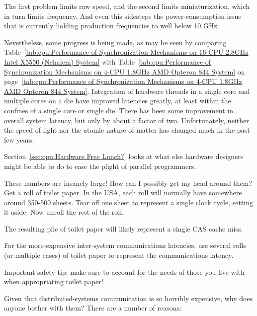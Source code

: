 	The first problem limits raw speed, and the second limits
	miniaturization, which in turn limits frequency.
	And even this sidesteps the power-consumption issue that
	is currently holding production frequencies to well below
	10 GHz.

	Nevertheless, some progress is being made, as may be seen
	by comparing
	Table~\ref{tab:cpu:Performance of Synchronization Mechanisms on 16-CPU 2.8GHz Intel X5550 (Nehalem) System}
	with
	Table~\ref{tab:cpu:Performance of Synchronization Mechanisms on 4-CPU 1.8GHz AMD Opteron 844 System}
	on
	page~\ref{tab:cpu:Performance of Synchronization Mechanisms on 4-CPU 1.8GHz AMD Opteron 844 System}.
	Integration of hardware threads in a single core and multiple
	cores on a die have improved latencies greatly, at least within the
	confines of a single core or single die.
	There has been some improvement in overall system latency,
	but only by about a factor of two.
	Unfortunately, neither the speed of light nor the atomic nature
	of matter has changed much in the past few years.

	Section~\ref{sec:cpu:Hardware Free Lunch?}
	looks at what else hardware designers might be
	able to do to ease the plight of parallel programmers.

\QuickQ{}
	These numbers are insanely large!
	How can I possibly get my head around them?
\QuickA{}
	Get a roll of toilet paper.
	In the USA, each roll will normally have somewhere around 350-500
	sheets.
	Tear off one sheet to represent a single clock cycle, setting it aside.
	Now unroll the rest of the roll.

	The resulting pile of toilet paper will likely represent a single
	CAS cache miss.

	For the more-expensive inter-system communications latencies,
	use several rolls (or multiple cases) of toilet paper to represent
	the communications latency.

	Important safety tip: make sure to account for the needs of
	those you live with when appropriating toilet paper!

\QuickQ{}
	Given that distributed-systems communication is so horribly
	expensive, why does anyone bother with them?
\QuickA{}
	There are a number of reasons:

